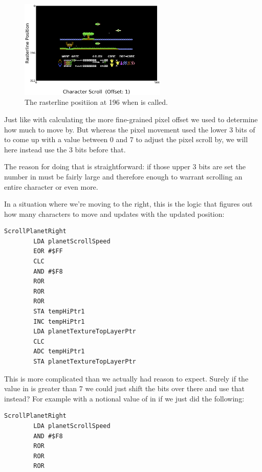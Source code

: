 \begin{figure}[H]
    \centering
      \includegraphics[width=7cm]{main_game/scroll/scroll1770.png}%
\caption{The rasterline positiion at 196 when  is called.}
\end{figure}

Just like with calculating the more fine-grained pixel offset we used  to determine
how much to move by. But whereas the pixel movement used the lower 3 bits of  to come
up with a value between 0 and 7 to adjust the pixel scroll by, we will here instead use the 3 bits before that.

The reason for doing that is straightforward: if those upper 3 bits are set the number in 
must be fairly large and therefore enough to warrant scrolling an entire character or even more.

In a situation where we're moving to the right, this is the logic that figures out how many characters to move and
updates  with the updated position:

\begin{lstlisting}
ScrollPlanetRight   
        LDA planetScrollSpeed
        EOR #$FF
        CLC
        AND #$F8
        ROR
        ROR
        ROR
        STA tempHiPtr1
        INC tempHiPtr1
        LDA planetTextureTopLayerPtr
        CLC
        ADC tempHiPtr1
        STA planetTextureTopLayerPtr
\end{lstlisting}

This is more complicated than we actually had reason to expect. Surely if the value in  is
greater than 7 we could just shift the bits over there and use that instead? For example with a notional value of
 in  if we just did the following:

\begin{lstlisting}
ScrollPlanetRight   
        LDA planetScrollSpeed
        AND #$F8
        ROR
        ROR
        ROR
\end{lstlisting}

